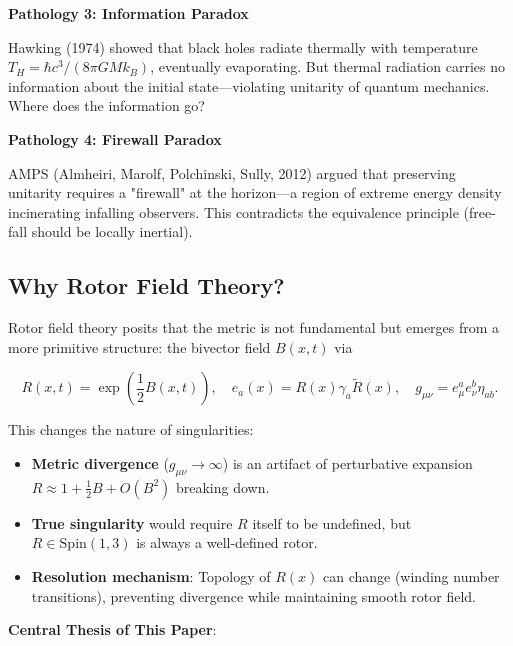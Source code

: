 \documentclass[11pt,a4paper]{article}
\numberwithin{equation}{section}
\theoremstyle{plain}
\theoremstyle{definition}
\theoremstyle{remark}
\newcommand{\rev}[1]{\widetilde{#1}}       %
\newcommand{\Spin}{\mathrm{Spin}}
\begin{document}
\textbf{Pathology 3: Information Paradox}

Hawking (1974) showed that black holes radiate thermally with temperature $T_H = \hbar c^3/(8\pi GMk_B)$, eventually evaporating. But thermal radiation carries no information about the initial state—violating unitarity of quantum mechanics. Where does the information go?

\textbf{Pathology 4: Firewall Paradox}

AMPS (Almheiri, Marolf, Polchinski, Sully, 2012) argued that preserving unitarity requires a "firewall" at the horizon—a region of extreme energy density incinerating infalling observers. This contradicts the equivalence principle (free-fall should be locally inertial).

\subsection{Why Rotor Field Theory?}

Rotor field theory posits that the metric is not fundamental but emerges from a more primitive structure: the bivector field $B(x,t)$ via

\begin{equation}
R(x,t) = \exp\left(\frac{1}{2}B(x,t)\right), \quad e_a(x) = R(x)\gamma_a\rev{R}(x), \quad g_{\mu\nu} = e_\mu^a e_\nu^b \eta_{ab}.
\label{eq:rotor-metric}
\end{equation}

This changes the nature of singularities:

\begin{itemize}
\item \textbf{Metric divergence} ($g_{\mu\nu} \to \infty$) is an artifact of perturbative expansion $R \approx 1 + \frac{1}{2}B + O(B^2)$ breaking down.

\item \textbf{True singularity} would require $R$ itself to be undefined, but $R \in \Spin(1,3)$ is always a well-defined rotor.

\item \textbf{Resolution mechanism}: Topology of $R(x)$ can change (winding number transitions), preventing divergence while maintaining smooth rotor field.
\end{itemize}

\textbf{Central Thesis of This Paper}:

\begin{center}
\end{center}
\end{document}
